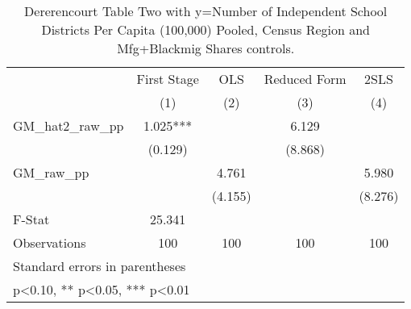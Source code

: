 \begin{table}[htbp]\centering
\def\sym#1{\ifmmode^{#1}\else\(^{#1}\)\fi}
\caption{Dererencourt Table Two with y=Number of Independent School Districts Per Capita (100,000) Pooled, Census Region and Mfg+Blackmig Shares controls.}
\begin{tabular}{l*{4}{c}}
\toprule
                    & First Stage   &         OLS   &Reduced Form   &        2SLS   \\
                    &\multicolumn{1}{c}{(1)}   &\multicolumn{1}{c}{(2)}   &\multicolumn{1}{c}{(3)}   &\multicolumn{1}{c}{(4)}   \\
\midrule
GM\_hat2\_raw\_pp      &       1.025***&               &       6.129   &               \\
                    &     (0.129)   &               &     (8.868)   &               \\
\addlinespace
GM\_raw\_pp           &               &       4.761   &               &       5.980   \\
                    &               &     (4.155)   &               &     (8.276)   \\
\midrule
F-Stat              &      25.341   &               &               &               \\
Observations        &         100   &         100   &         100   &         100   \\
\bottomrule
\multicolumn{5}{l}{\footnotesize Standard errors in parentheses}\\
\multicolumn{5}{l}{\footnotesize * p<0.10, ** p<0.05, *** p<0.01}\\
\end{tabular}
\end{table}
